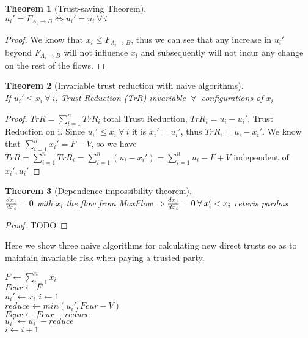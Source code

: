 \documentclass[11pt]{article}
\newtheorem{theorem}{Theorem}[section]
\theoremstyle{definition}
\theoremstyle{corollary}
\begin{document}
    \begin{theorem}[Trust-saving Theorem] \ \\
       $u_i' = F_{A_i \rightarrow B} \Leftrightarrow u_i' = u_i \: \forall \: i$
    \end{theorem}
    \begin{proof}
       We know that $x_i \leq F_{A_i \rightarrow B}$, thus we can see that any increase in $u_i'$ beyond
       $F_{A_i \rightarrow B}$ will not influence $x_i$ and subsequently will not incur any change on the rest of the flows.
    \end{proof}

    \begin{theorem}[Invariable trust reduction with naive algorithms] \ \\
       If $u_i' \leq x_i \: \forall \: i$, Trust Reduction (TrR) invariable $\: \forall \:$ configurations of $x_i$
    \end{theorem}
    \begin{proof}
       $TrR = \sum_{i=1}^{n}TrR_i$ total Trust Reduction, $TrR_i = u_i - u_i'$, Trust Reduction on i.
       Since $u_i' \leq x_i \: \forall \: i$ it is $x_i' = u_i'$, thus $TrR_i = u_i - x_i'$. We know that
       $\sum_{i=1}^{n}x_i' = F - V$, so we have $TrR = \sum_{i=1}^{n}TrR_i = \sum_{i=1}^{n}(u_i - x_i') = 
       \sum_{i=1}^{n}u_i - F + V$ independent of $x_i', u_i'$
    \end{proof}

    \begin{theorem}[Dependence impossibility theorem] \ \\
       ${d x_j \over d x_i} = 0$ with $x_i$ the flow from MaxFlow $\Rightarrow {d x_j \over d x_i} = 0 \:
       \forall \: x_i' < x_i$ ceteris paribus
    \end{theorem}
    \begin{proof}
       TODO
    \end{proof}

    Here we show three naive algorithms for calculating new direct trusts so as to maintain invariable risk when paying
    a trusted party. \\
    \begin{algorithm}[H]
       $F \gets \sum_{i=1}^{n}x_i$ \\
       $Fcur \gets F$ \\
          {$u_i' \gets x_i$} 
       $i \gets 1$ \\
          {$reduce \gets min(u_i', Fcur - V)$ \\
           $Fcur \gets Fcur - reduce$ \\
           $u_i' \gets u_i' - reduce$ \\
           $i \gets i + 1$}
       \caption{First-come, first-served trust transfer}
    \end{algorithm}
\end{document}
